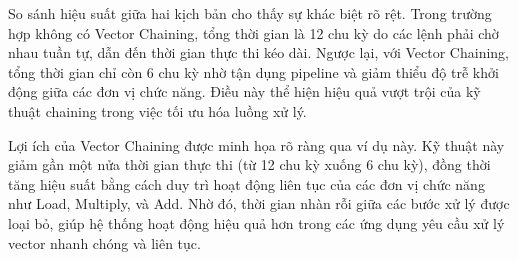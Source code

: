 \documentclass[a4paper]{article}
\begin{document}
So sánh hiệu suất giữa hai kịch bản cho thấy sự khác biệt rõ rệt. Trong trường hợp không có Vector Chaining, tổng thời gian là 12 chu kỳ do các lệnh phải chờ nhau tuần tự, dẫn đến thời gian thực thi kéo dài. Ngược lại, với Vector Chaining, tổng thời gian chỉ còn 6 chu kỳ nhờ tận dụng pipeline và giảm thiểu độ trễ khởi động giữa các đơn vị chức năng. Điều này thể hiện hiệu quả vượt trội của kỹ thuật chaining trong việc tối ưu hóa luồng xử lý.

Lợi ích của Vector Chaining được minh họa rõ ràng qua ví dụ này. Kỹ thuật này giảm gần một nửa thời gian thực thi (từ 12 chu kỳ xuống 6 chu kỳ), đồng thời tăng hiệu suất bằng cách duy trì hoạt động liên tục của các đơn vị chức năng như Load, Multiply, và Add. Nhờ đó, thời gian nhàn rỗi giữa các bước xử lý được loại bỏ, giúp hệ thống hoạt động hiệu quả hơn trong các ứng dụng yêu cầu xử lý vector nhanh chóng và liên tục.
\end{document}
